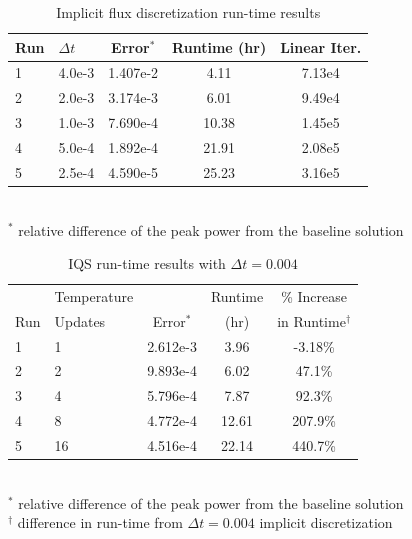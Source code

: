 \documentclass{elsarticle}
\begin{document}
\begin{table}[!htbp]
\begin{center}
\caption{Implicit flux discretization run-time results}
\label{tab:ndiff_lra}
\begin{tabular}{|l|l|ccc|}
\hline
Run  &  $\Delta t$ & Error$^*$ & Runtime (hr) & Linear Iter.\\
\hline
1	& 4.0e-3	& 1.407e-2 	& 4.11	& 7.13e4	\\
\rowcolor{yellow} 2	& 2.0e-3	& 3.174e-3 	& 6.01	& 9.49e4 	\\
3 	& 1.0e-3 	& 7.690e-4 	& 10.38	& 1.45e5	\\
4 	& 5.0e-4 	& 1.892e-4 	& 21.91	& 2.08e5	\\
5 	& 2.5e-4	& 4.590e-5 	& 25.23	& 3.16e5	\\
\hline
\end{tabular} \\
\footnotesize{$^*$ relative difference of the peak power from the baseline solution}
\end{center}
\end{table}

\begin{table}[!htbp]
\begin{center}
\caption{IQS run-time results with $\Delta t = 0.004$}
\label{tab:iqs_lra}
\begin{tabular}{|l|l|ccc|}
\hline
	&  Temperature 	&  		& Runtime 	& \% Increase	\\
Run	&  Updates 	& Error$^*$ & (hr)		& in Runtime$^{\dagger}$\\
\hline
\rowcolor{yellow} 1	& 1		& 2.612e-3 	& 3.96 	& -3.18\%	\\
2	& 2		& 9.893e-4 	& 6.02	&  47.1\%	\\
3 	& 4 	& 5.796e-4 	& 7.87	&  92.3\%	\\
4 	& 8 	& 4.772e-4 	& 12.61	& 207.9\% 	\\
5 	& 16	& 4.516e-4 	& 22.14	& 440.7\%	\\
\hline
\end{tabular}
\\
\footnotesize{$^*$ relative difference of the peak power from the baseline solution}\\
\footnotesize{$^{\dagger}$ difference in run-time from $\Delta t = 0.004$ implicit discretization} 
\end{center}
\end{table}
\end{document}
